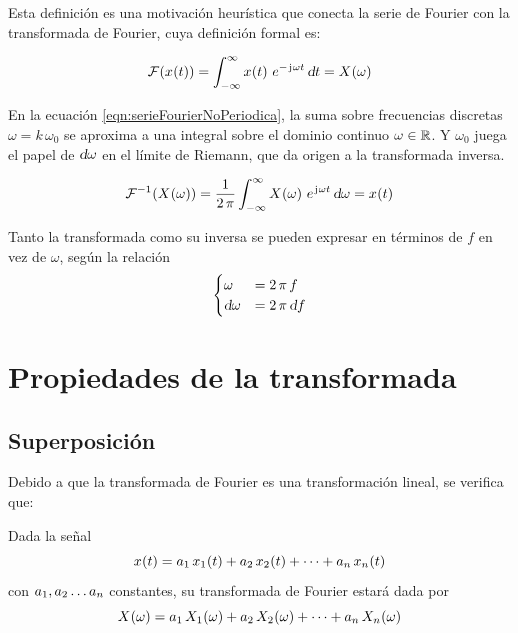 Esta definición es una motivación heurística que conecta la serie de Fourier con la transformada de Fourier, cuya definición formal es:

\begin{mdframed}[style=DefinitionFrame]
    \begin{defn}
        \label{defn:FourierTrans}
    \end{defn}
    \[
        \fourier{\fx[x]{t}}
        = \int_{-\infty}^\infty \fx[x]{t} \, e^{- \iu \omega t} \, \dif t
        = \fx[X]{\omega}
    \]
\end{mdframed}

En la ecuación \ref{eqn:serieFourierNoPeriodica}, la suma sobre frecuencias discretas $\omega = k \, \omega_0$ se aproxima a una integral sobre el dominio continuo $\omega \in \setR$.
Y $\omega_0$ juega el papel de $\dif \omega$ en el límite de Riemann, que da origen a la transformada inversa.

\begin{mdframed}[style=DefinitionFrame]
    \begin{defn}
        \label{defn:FourierTransInv}
    \end{defn}
    \[
        \ffourier{\fx[X]{\omega}}
        = \frac{1}{2 \, \pi} \int_{-\infty}^\infty \fx[X]{\omega} \, \complexExp \, \dif \omega
        = \fx[x]{t}
    \]
\end{mdframed}

Tanto la transformada como su inversa se pueden expresar en términos de $f$ en vez de $\omega$, según la relación
\[
    \begin{cases}
        \omega &= 2 \, \pi \, f
        \\
        \dif \omega &= 2 \, \pi \, \dif f
    \end{cases}
\]

\section{Propiedades de la transformada}

\subsection{Superposición}

Debido a que la transformada de Fourier es una transformación lineal, se verifica que:

\begin{mdframed}[style=PropertyFrame]
    \begin{prop}
    \end{prop}
    Dada la señal
    \[
        \fx[x]{t} = a_1 \, \fx[x_1]{t} + a_2 \, \fx[x_2]{t} + \dots + a_\nth \, \fx[x_\nth]{t}
    \]
    con $a_1, a_2 \dots a_\nth$ constantes, su transformada de Fourier estará dada por
    \[
        \fx[X]{\omega} = a_1 \, \fx[X_1]{\omega} + a_2 \, \fx[X_2]{\omega} + \dots + a_\nth \, \fx[X_\nth]{\omega}
    \]
\end{mdframed}

